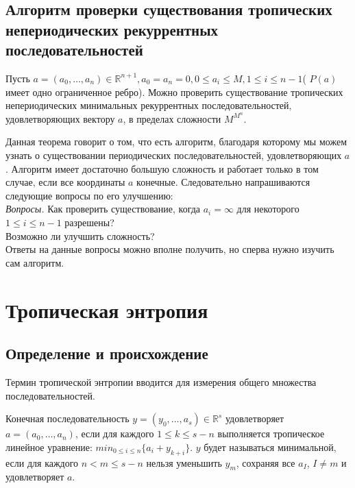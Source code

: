 \documentclass[russian]{lecture-notes}
\begin{document}
\subsection{ Алгоритм проверки существования тропических непериодических рекуррентных последовательностей}

\begin{Theorem}
	 Пусть $a = (a_0,\ldots, a_n) \in \mathbb{R}^{n+1}, a_0=a_n=0, 0 \le a_i \le M, 1 \le i \le n-1$( $P(a)$ имеет одно ограниченное ребро). Можно проверить существование тропических непериодических минимальных рекуррентных последовательностей, удовлетворяющих вектору $a$, в пределах сложности $M^{M^n}$.\\
\end{Theorem}


Данная теорема говорит о том, что есть алгоритм, благодаря которому мы можем узнать о существовании периодических последовательностей, удовлетворяющих $a$. Алгоритм имеет достаточно большую сложность и работает только в том случае, если все координаты $a$ конечные. Следовательно напрашиваются следующие вопросы по его улучшению:\\

\emph{Вопросы.} Как проверить существование, когда $a_i=\infty$ для некоторого $1 \le i \le n-1$ разрешены?\\
Возможно ли улучшить сложность? \\

Ответы на данные вопросы можно вполне получить, но сперва нужно изучить сам алгоритм.
\section{Тропическая энтропия}


\subsection{Определение и происхождение}


Термин тропической энтропии вводится для измерения общего множества последовательностей.\\
\begin{Definition}
	Конечная последовательность $y = (y_0,\ldots, a_s) \in \mathbb{R}^{s}$ удовлетворяет $a=(a_0,\ldots, a_n)$, если для каждого $1 \le k \le s-n$ выполняется тропическое линейное уравнение: $min_{0\le i \le n}\{a_i + y_{k+i}\}$. $y$ будет называться минимальной, если для каждого $n<m\le s-n$ нельзя уменьшить $y_m$, сохраняя все $a_I$, $I\ne m$ и удовлетворяет $a$. \\
\end{Definition}
\end{document}
